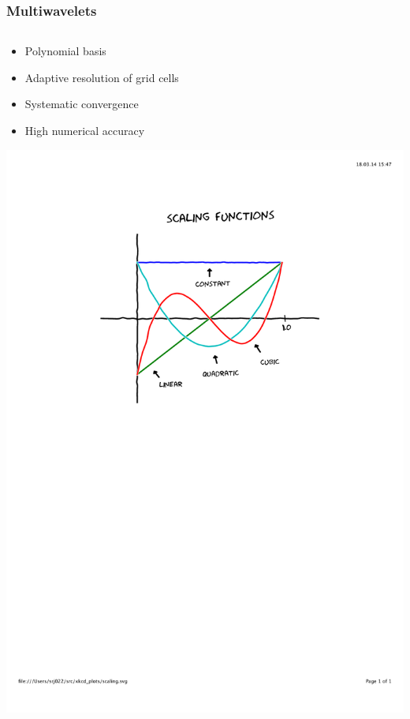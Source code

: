\begin{frame}
\frametitle{Multiwavelets}
\begin{columns}
\begin{column}[b]{0.55\linewidth}
\scriptsize
\begin{itemize}
\item Polynomial basis
\item Adaptive resolution of grid cells
\item Systematic convergence
\item High numerical accuracy
\end{itemize}

\vspace{5mm}

\includegraphics[scale=0.5, clip, viewport=150 450 450 750]{figures/scaling.pdf}
\end{column}


\end{columns}
\end{frame}
